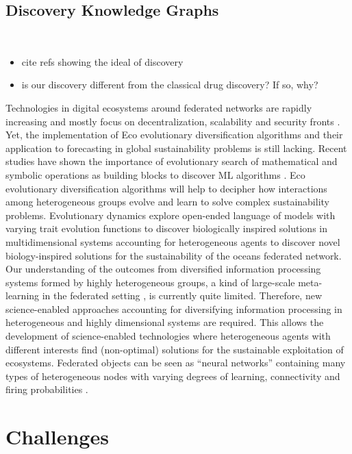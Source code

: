 \documentclass[12pt,a4paper]{article}
\begin{document}
\subsection{Discovery Knowledge Graphs}
\\
\begin{itemize}
    \item cite refs showing the ideal of discovery
    \item is our discovery different from the classical drug discovery? If so, why?
\end{itemize}

Technologies in digital ecosystems around federated networks are rapidly increasing and mostly focus on decentralization, scalability and security fronts \cite{Androulaki2018,OceanProtocolFoundation2018,BigchainDBGmbH2018}. Yet, the implementation of Eco evolutionary diversification algorithms and their application to forecasting in global sustainability problems is still lacking. Recent studies have shown the importance of evolutionary search of mathematical and symbolic operations as building blocks to discover ML algorithms \citep{Real2020,Guimera2020}. Eco evolutionary diversification algorithms will help to decipher how interactions among heterogeneous groups evolve and learn to solve complex sustainability problems. Evolutionary dynamics explore open-ended language of models with varying trait evolution functions to discover biologically inspired solutions in multidimensional systems \citep{Real2020} accounting for heterogeneous agents to discover novel biology-inspired solutions for the sustainability of the oceans federated network.
Our understanding of the outcomes from diversified information processing systems formed by highly heterogeneous groups, a kind of large-scale meta-learning in the federated setting \citep{Dilley2016}, is currently quite limited. Therefore, new science-enabled approaches accounting for diversifying information processing in heterogeneous and highly dimensional systems are required. This allows the development of science-enabled technologies where heterogeneous agents with different interests find (non-optimal) solutions for the sustainable exploitation of ecosystems. Federated objects can be seen as ``neural networks'' containing many types of heterogeneous nodes with varying degrees of learning, connectivity and firing probabilities \citep{Maass2014,Maass2015}.

\section{Challenges}
\end{document}
